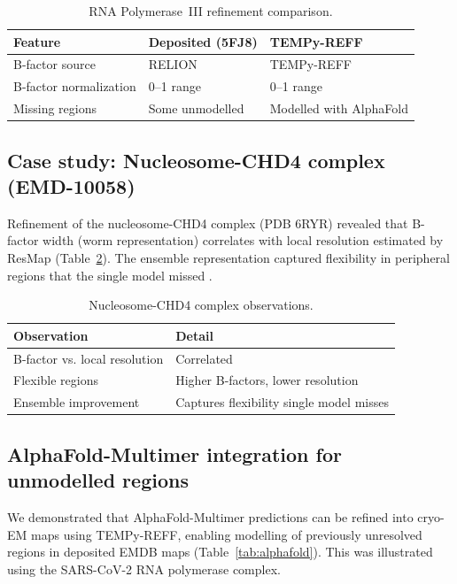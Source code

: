 \documentclass[11pt,a4paper]{article}
\begin{document}
\begin{table}[htbp]
\centering
\caption{RNA Polymerase~III refinement comparison.}
\label{tab:poliii}
\begin{tabular}{lll}
\toprule
\textbf{Feature} & \textbf{Deposited (5FJ8)} & \textbf{TEMPy-REFF} \\
\midrule
B-factor source & RELION & TEMPy-REFF \\
B-factor normalization & 0--1 range & 0--1 range \\
Missing regions & Some unmodelled & Modelled with AlphaFold \\
\bottomrule
\end{tabular}
\end{table}

\subsection{Case study: Nucleosome-CHD4 complex (EMD-10058)}

Refinement of the nucleosome-CHD4 complex (PDB 6RYR) revealed that B-factor width (worm representation) correlates with local resolution estimated by ResMap (Table~\ref{tab:chd4}). The ensemble representation captured flexibility in peripheral regions that the single model missed \citep{Kucukelbir2014}.

\begin{table}[htbp]
\centering
\caption{Nucleosome-CHD4 complex observations.}
\label{tab:chd4}
\begin{tabular}{ll}
\toprule
\textbf{Observation} & \textbf{Detail} \\
\midrule
B-factor vs. local resolution & Correlated \\
Flexible regions & Higher B-factors, lower resolution \\
Ensemble improvement & Captures flexibility single model misses \\
\bottomrule
\end{tabular}
\end{table}

\subsection{AlphaFold-Multimer integration for unmodelled regions}

We demonstrated that AlphaFold-Multimer predictions can be refined into cryo-EM maps using TEMPy-REFF, enabling modelling of previously unresolved regions in deposited EMDB maps (Table~\ref{tab:alphafold}). This was illustrated using the SARS-CoV-2 RNA polymerase complex.
\end{document}
